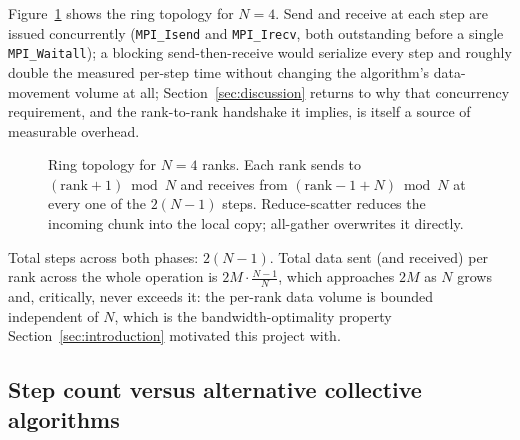 Figure~\ref{fig:ring-topology} shows the ring topology for $N=4$. Send and receive at each step are issued concurrently (\texttt{MPI\_Isend} and \texttt{MPI\_Irecv}, both outstanding before a single \texttt{MPI\_Waitall}); a blocking send-then-receive would serialize every step and roughly double the measured per-step time without changing the algorithm's data-movement volume at all; Section~\ref{sec:discussion} returns to why that concurrency requirement, and the rank-to-rank handshake it implies, is itself a source of measurable overhead.

\begin{figure}[htbp]
\centering
{}
\caption{Ring topology for $N=4$ ranks. Each rank sends to $(\text{rank}+1) \bmod N$ and receives from $(\text{rank}-1+N) \bmod N$ at every one of the $2(N-1)$ steps. Reduce-scatter reduces the incoming chunk into the local copy; all-gather overwrites it directly.}
\label{fig:ring-topology}
\end{figure}

Total steps across both phases: $2(N-1)$. Total data sent (and received) per rank across the whole operation is $2M\cdot\frac{N-1}{N}$, which approaches $2M$ as $N$ grows and, critically, never exceeds it: the per-rank data volume is bounded independent of $N$, which is the bandwidth-optimality property Section~\ref{sec:introduction} motivated this project with.

\subsection{Step count versus alternative collective algorithms}
\label{sec:step-count}

